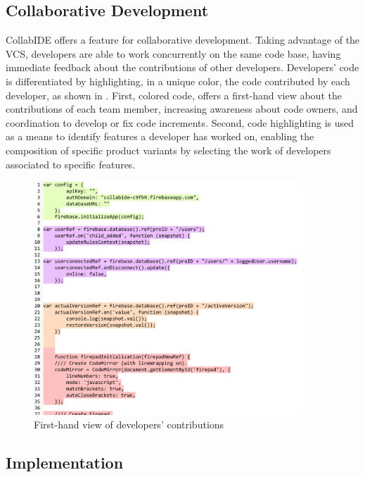 \subsection{Collaborative Development}

CollabIDE offers a feature for collaborative development. Taking advantage of the \ac{VCS}, developers 
are able to work concurrently on the same code base, having immediate feedback about the 
contributions of other developers.
Developers' code is differentiated by highlighting, in a unique color, the code contributed by each 
developer, as shown in . First, colored code, offers a first-hand view about the 
contributions of each team member, increasing awareness  about code owners, and coordination to 
develop or fix code increments. Second, code highlighting is used as a means to identify features a 
developer has worked on, enabling the composition of specific product variants by selecting the work 
of developers associated to specific features. 

\begin{figure}[htbp]
  \centering
  \includegraphics[width=0.9\textwidth]{img/fig2-collabIDEConcurrentProgramming}
  \caption{First-hand view of developers' contributions}
  \label{fig:layers}
\end{figure}


\subsection{Implementation}
\label{sec:implementation}

